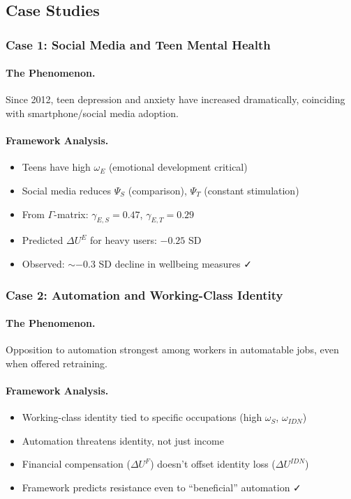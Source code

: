 \subsection{Case Studies}

\subsubsection{Case 1: Social Media and Teen Mental Health}

\paragraph{The Phenomenon.}
Since 2012, teen depression and anxiety have increased dramatically, 
coinciding with smartphone/social media adoption.

\paragraph{Framework Analysis.}
\begin{itemize}
    \item Teens have high $\omega_E$ (emotional development critical)
    \item Social media reduces $\Psi_S$ (comparison), $\Psi_T$ (constant stimulation)
    \item From $\Gamma$-matrix: $\gamma_{E,S} = 0.47$, $\gamma_{E,T} = 0.29$
    \item Predicted $\Delta U^E$ for heavy users: $-0.25$ SD
    \item Observed: $\sim -0.3$ SD decline in wellbeing measures ✓
\end{itemize}

\subsubsection{Case 2: Automation and Working-Class Identity}

\paragraph{The Phenomenon.}
Opposition to automation strongest among workers in automatable jobs, 
even when offered retraining.

\paragraph{Framework Analysis.}
\begin{itemize}
    \item Working-class identity tied to specific occupations (high $\omega_S$, $\omega_{IDN}$)
    \item Automation threatens identity, not just income
    \item Financial compensation ($\Delta U^F$) doesn't offset identity loss ($\Delta U^{IDN}$)
    \item Framework predicts resistance even to ``beneficial'' automation ✓
\end{itemize}

